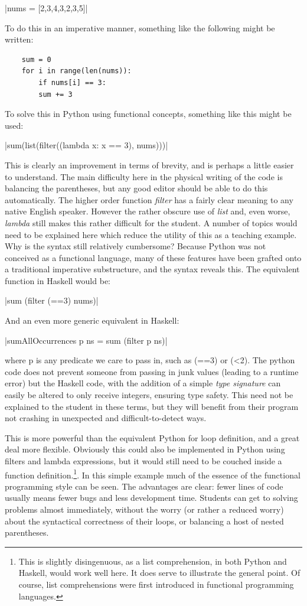 \documentclass[12pt, a4paper]{report}
\begin{document}
|nums = [2,3,4,3,2,3,5]|

To do this in an imperative manner, something like the following might be written:

\begin{verbatim}
    sum = 0
    for i in range(len(nums)):
        if nums[i] == 3:
        sum += 3
\end{verbatim}

To solve this in Python using functional concepts, something like this might be used:

|sum(list(filter((lambda x: x == 3), nums)))|

This is clearly an improvement in terms of brevity, and is perhaps a little easier to understand.
The main difficulty here in the physical writing of the code is balancing the parentheses,
but any good editor should be able to do this automatically. The higher order function
\textit{filter} has a fairly clear meaning to any native English speaker. However the rather obscure
use of \textit{list} and, even worse, \textit{lambda} still makes this rather difficult for the
student. A number of topics would need to be explained here which reduce the utility
of this as a teaching example. Why is the syntax still relatively cumbersome? Because Python was
not conceived as a functional language, many of these features have been grafted onto a traditional
imperative substructure, and the syntax reveals this. The equivalent function in Haskell would be:

|sum (filter (==3) nums)|

And an even more generic equivalent in Haskell:

|sumAllOccurrences p ns = sum (filter p ns)|

where p is any predicate we care to pass in, such as (==3) or (\textless2). The python code does not
prevent someone from passing in junk values (leading to a runtime error) but the Haskell code, with
the addition of a simple \textit{type signature} can easily be altered to only receive integers,
ensuring type safety. This need not be explained to the student in these terms, but they will
benefit from their program not crashing in unexpected and difficult-to-detect ways. 

This is more powerful than the equivalent Python for loop definition, and a great deal more
flexible. Obviously this could also be implemented in Python using filters and lambda expressions,
but it would still need to be couched inside a function definition.\footnote{This is slightly
disingenuous, as a list comprehension, in both Python and Haskell, would work well here. It does
serve to illustrate the general point. Of course, list comprehensions were first introduced in
functional programming languages.}. In this simple example much of the essence of the functional
programming style can be seen. The advantages are clear: fewer lines of code usually means fewer
bugs and less development time. Students can get to solving problems almost immediately, without the
worry (or rather a reduced worry) about the syntactical correctness of their loops, or balancing a
host of nested parentheses.
\end{document}
